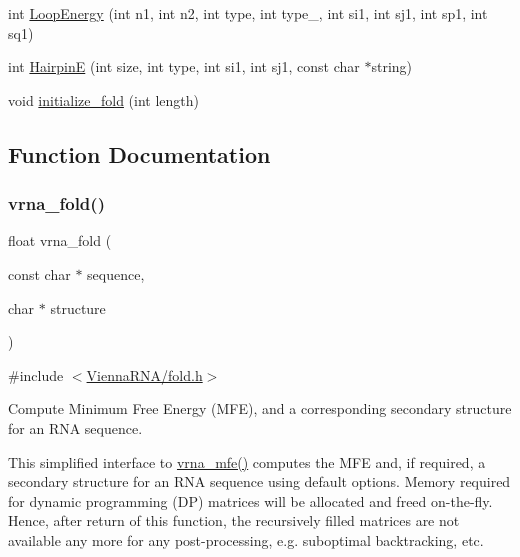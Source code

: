 \begin{DoxyCompactItemize}
\item 
int \hyperlink{group__mfe__fold__single_ga2163034a25c6115d894b199e97e03f6c}{Loop\+Energy} (int n1, int n2, int type, int type\+\_, int si1, int sj1, int sp1, int sq1)
\item 
int \hyperlink{group__mfe__fold__single_gab327ce11972f5ac069d52c8dedfdb700}{HairpinE} (int size, int type, int si1, int sj1, const char $\ast$string)
\item 
void \hyperlink{group__mfe__fold__single_gac3f0a28d9cb609d388b155445073fd20}{initialize\+\_\+fold} (int length)
\end{DoxyCompactItemize}


\subsection{Function Documentation}
\mbox{\label{group__mfe__fold__single_ga29a33b2895f4e67b0480271ff289afdc}} 
\subsubsection{\texorpdfstring{vrna\+\_\+fold()}{vrna\_fold()}}
{\footnotesize\ttfamily float vrna\+\_\+fold (\begin{DoxyParamCaption}\item[{const char $\ast$}]{sequence,  }\item[{char $\ast$}]{structure }\end{DoxyParamCaption})}



{\ttfamily \#include $<$\hyperlink{fold_8h}{Vienna\+R\+N\+A/fold.\+h}$>$}



Compute Minimum Free Energy (M\+FE), and a corresponding secondary structure for an R\+NA sequence. 

This simplified interface to \hyperlink{group__mfe__fold_gabd3b147371ccf25c577f88bbbaf159fd}{vrna\+\_\+mfe()} computes the M\+FE and, if required, a secondary structure for an R\+NA sequence using default options. Memory required for dynamic programming (DP) matrices will be allocated and free\textquotesingle{}d on-\/the-\/fly. Hence, after return of this function, the recursively filled matrices are not available any more for any post-\/processing, e.\+g. suboptimal backtracking, etc.


